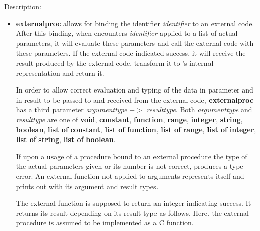 \noindent Description: \begin{itemize}

\item \textbf{externalproc} allows for binding the \sollya identifier
   \emph{identifier} to an external code.  After this binding, when \sollya
   encounters \emph{identifier} applied to a list of actual parameters, it
   will evaluate these parameters and call the external code with these
   parameters. If the external code indicated success, it will receive
   the result produced by the external code, transform it to \sollya's
   internal representation and return it.
    
   In order to allow correct evaluation and typing of the data in
   parameter and in result to be passed to and received from the external
   code, \textbf{externalproc} has a third parameter \emph{argumenttype} $->$ \emph{resulttype}.
   Both \emph{argumenttype} and \emph{resulttype} are one of \textbf{void}, \textbf{constant},
   \textbf{function}, \textbf{range}, \textbf{integer}, \textbf{string}, \textbf{boolean}, \textbf{list of} \textbf{constant}, \textbf{list of} \textbf{function}, 
   \textbf{list of} \textbf{range}, \textbf{list of} \textbf{integer}, \textbf{list of} \textbf{string}, \textbf{list of} \textbf{boolean}.
    
   If upon a usage of a procedure bound to an external procedure the type
   of the actual parameters given or its number is not correct, \sollya
   produces a type error. An external function not applied to arguments
   represents itself and prints out with its argument and result types.
    
   The external function is supposed to return an integer indicating
   success.  It returns its result depending on its \sollya result type
   as follows. Here, the external procedure is assumed to be implemented
   as a C function.
    

\end{itemize}
